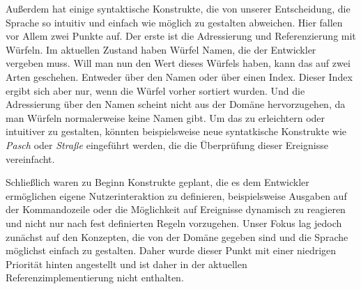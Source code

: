 	Außerdem hat \dg einige syntaktische Konstrukte, die von unserer Entscheidung, die Sprache so intuitiv und einfach wie möglich zu gestalten abweichen. Hier fallen vor Allem zwei Punkte auf. Der erste ist die Adressierung und Referenzierung mit Würfeln. Im aktuellen Zustand haben Würfel Namen, die der Entwickler vergeben muss. Will man nun den Wert dieses Würfels haben, kann das auf zwei Arten geschehen. Entweder über den Namen oder über einen Index. Dieser Index ergibt sich aber nur, wenn die Würfel vorher sortiert wurden. Und die Adressierung über den Namen scheint nicht aus der Domäne hervorzugehen, da man Würfeln normalerweise keine Namen gibt. Um das zu erleichtern oder intuitiver zu gestalten, könnten beispielsweise neue syntatkische Konstrukte wie \emph{Pasch} oder \emph{Straße} eingeführt werden, die die Überprüfung dieser Ereignisse vereinfacht.
	
	Schließlich waren zu Beginn Konstrukte geplant, die es dem Entwickler ermöglichen eigene Nutzerinteraktion zu definieren, beispielsweise Ausgaben auf der Kommandozeile oder die Möglichkeit auf Ereignisse dynamisch zu reagieren und nicht nur nach fest definierten Regeln vorzugehen. Unser Fokus lag jedoch zunächst auf den Konzepten, die von der Domäne gegeben sind und die Sprache möglichst einfach zu gestalten. Daher wurde dieser Punkt mit einer niedrigen Priorität hinten angestellt und ist daher in der aktuellen Referenzimplementierung nicht enthalten.













